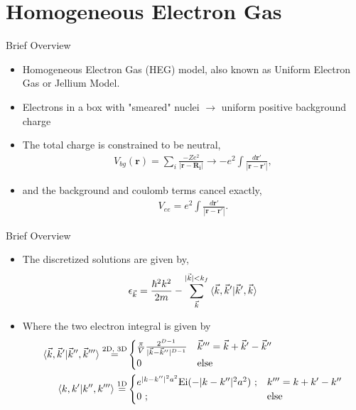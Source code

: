 \documentclass[10pt]{beamer}
\begin{document}
{{{{{{\section{Homogeneous Electron Gas}

{%

\begin{frame}{Brief Overview}
	\begin{itemize}
		\item{Homogeneous Electron Gas (HEG) model, also known as Uniform Electron Gas or Jellium Model.}
		\item{Electrons in a box with "smeared" nuclei $\rightarrow$ uniform positive background charge}
		\item{The total charge is constrained to be neutral,}
			\begin{eqnarray}
				V_{bg}(\mathbf{r}) = \sum\limits_{i} \frac{-Ze^2}{|\mathbf{r}-\mathbf{R_i}|} \rightarrow -e^2 \int \frac{d\mathbf{r'}}{|\mathbf{r}-\mathbf{r'}|},
			\end{eqnarray}
		\item{and the background and coulomb terms cancel exactly,
			\begin{eqnarray}
				V_{ee} = e^2 \int \frac{d\mathbf{r'}}{|\mathbf{r}-\mathbf{r'}|}.
			\end{eqnarray}
		}
	\end{itemize}
\end{frame}

{%

\begin{frame}{Brief Overview}
	\begin{itemize}
		\item{The discretized solutions are given by,
		\begin{eqnarray}\label{eq:hf_orb_energy}
			\epsilon_{\vec{k}}=
				\frac{\hbar^2 k^2}{2m} - \sum\limits_{\vec{k}}^{|\vec{k}|< k_f}
				\braket{\vec{k}, \vec{k}' |\vec{k}', \vec{k}}
		\end{eqnarray}
		}
		\item{Where the two electron integral is given by
		\begin{align}
			\braket{\vec{k}, \vec{k}'|\vec{k}'',\vec{k}'''}\stackrel{\text{2D, 3D}}{=}&
				\begin{cases} 
				\frac{\pi}{V}\frac{2^{D-1}}{|\vec{k}-\vec{k}''|^{D-1}} 
				& \vec{k}''' = \vec{k}+\vec{k}'-\vec{k}'' \nonumber\\
				0 
				& \text{else}
				\end{cases}
			\nonumber \\
			\braket{k, k'|k'',k'''}\stackrel{\text{1D}}{=}&
				\begin{cases} 
				e^{|k-k''|^2a^2}\text{Ei}(-|k-k''|^2a^2)\text{ ;}
				& k''' = k+k'-k'' \\
				0\text{ ;} 
				& \text{else}
				\end{cases}
		\end{align}
		}
	\end{itemize}
\end{frame}

}}}}}}}}
\end{document}
